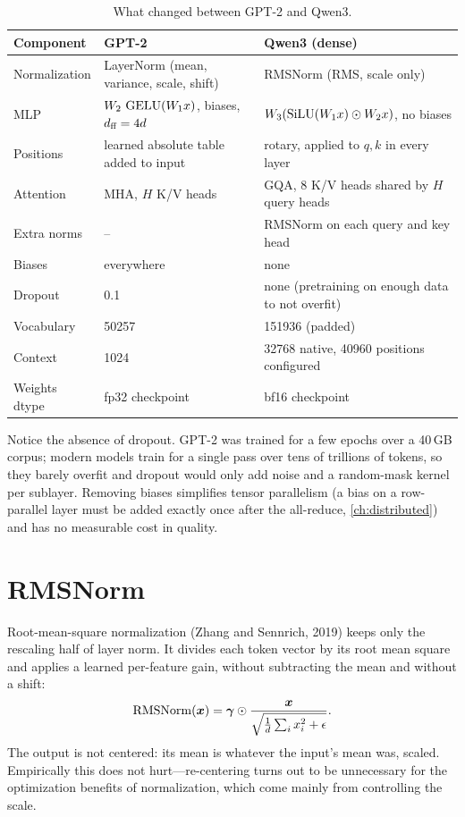 \begin{table}[h]
\centering\small
\begin{tabularx}{\linewidth}{lXX}
\toprule
Component & GPT-2 & Qwen3 (dense) \\
\midrule
Normalization & LayerNorm (mean, variance, scale, shift) & RMSNorm (RMS, scale only)\\
MLP & $W_2\,\operatorname{GELU}(W_1x)$, biases, $d_{\text{ff}}=4d$ & $W_3(\operatorname{SiLU}(W_1x)\odot W_2x)$, no biases\\
Positions & learned absolute table added to input & rotary, applied to $q,k$ in every layer\\
Attention & MHA, $H$ K/V heads & GQA, 8 K/V heads shared by $H$ query heads\\
Extra norms & -- & RMSNorm on each query and key head\\
Biases & everywhere & none\\
Dropout & 0.1 & none (pretraining on enough data to not overfit)\\
Vocabulary & \num{50257} & \num{151936} (padded)\\
Context & 1024 & \num{32768} native, \num{40960} positions configured\\
Weights dtype & fp32 checkpoint & bf16 checkpoint\\
\bottomrule
\end{tabularx}
\caption{What changed between GPT-2 and Qwen3.}
\label{tab:modern:diff}
\end{table}

Notice the absence of dropout. GPT-2 was trained for a few epochs over a 40\,GB corpus;
modern models train for a single pass over tens of trillions of tokens, so they barely overfit and
dropout would only add noise and a random-mask kernel per sublayer. Removing biases simplifies tensor
parallelism (a bias on a row-parallel layer must be added exactly once after the all-reduce,
\cref{ch:distributed}) and has no measurable cost in quality.

\section{RMSNorm}\label{sec:modern:rmsnorm}

Root-mean-square normalization (Zhang and Sennrich, 2019) keeps only the rescaling half of layer
norm. It divides each token vector by its root mean square and applies a learned per-feature gain,
without subtracting the mean and without a shift:
\begin{equation}
\mathrm{RMSNorm}(\bm{x}) = \bm{\gamma}\odot\frac{\bm{x}}{\sqrt{\tfrac1d\sum_i x_i^2+\epsilon}} .
\label{eq:modern:rms}
\end{equation}
The output is not centered: its mean is whatever the input's mean was, scaled. Empirically this does
not hurt---re-centering turns out to be unnecessary for the optimization benefits of normalization,
which come mainly from controlling the scale.

